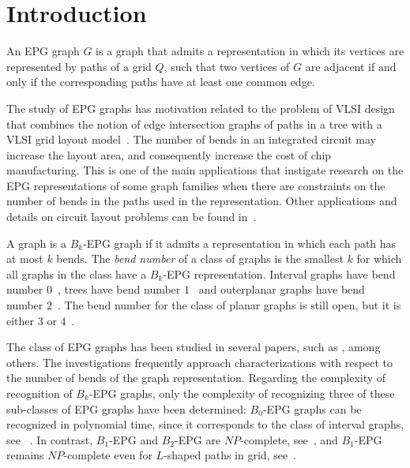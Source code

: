 \documentclass[runningheads]{llncs}
\begin{document}
\section{Introduction}
An EPG graph $G$ is a graph that admits a representation in which its vertices are represented by paths of a grid $Q$, such that two vertices of $G$ are adjacent if and only if the corresponding paths have at least one common edge. 

The study of EPG graphs has motivation related to the problem of VLSI design that combines the notion  of  edge  intersection graphs  of  paths  in  a  tree  with  a  VLSI  grid  layout  model~\cite{golumbic2009}. The number of bends in an integrated circuit may increase the layout area, and consequently increase the cost of chip manufacturing.
This is one of the main applications that instigate research on the EPG representations of some graph families when there are constraints on the number of bends in the paths used in the representation.
Other applications and  details  on  circuit  layout  problems can be found in~\cite{bandy1990, molitor1991}.  %

A graph is a $ B_k$-EPG graph if it admits a representation in which each path has at most $k$ bends. %
The \emph{bend number} of a class of graphs is the smallest $k$ for which all graphs in the class have a $B_k$-EPG representation. Interval graphs have bend number $0$~\cite{golumbic2009}, trees have bend number $1$~\cite{golumbic2009} and outerplanar graphs have bend number $2$~\cite{daniel2014b}. The bend number for the class of planar graphs is still open, but it is either $ 3 $ or $4$~\cite{daniel2014b}.



The class of EPG graphs has been studied in several papers, such as \cite{alcon2016, Asinowski2009, cohen2014, golumbic2009, heldt2014,  martin2017}, among others. The investigations frequently approach characterizations with respect to the number of bends of the graph representation. Regarding the complexity of recognition of $B_k$-EPG graphs, only the complexity of recognizing three of these sub-classes of EPG graphs have been determined: %
 $B_0$-EPG graphs can be recognized in polynomial time, since it corresponds to the class of interval graphs, see ~\cite{booth1976}. In contrast, $B_1$-EPG and $B_2$-EPG are $NP$-complete, see~\cite{heldt2014, martin2017}, and $B_1$-EPG remains $NP$-complete even for $L$-shaped paths in grid, see~\cite{cameron2016edge}.
\end{document}
